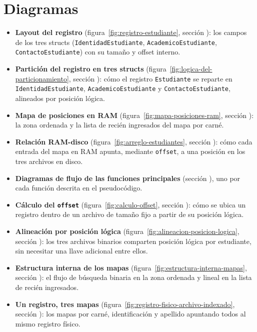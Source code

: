 \section{Diagramas}
\label{sec:diagramas}

\begin{itemize}
    \item \textbf{Layout del registro} (figura~\ref{fig:registro-estudiante}, sección ):
        los campos de los tres structs (\texttt{IdentidadEstudiante}, \texttt{AcademicoEstudiante}, \texttt{ContactoEstudiante}) con su tamaño y offset interno.
    \item \textbf{Partición del registro en tres structs} (figura~\ref{fig:logica-del-particionamiento}, sección ):
        cómo el registro \texttt{Estudiante} se reparte en \texttt{IdentidadEstudiante}, \texttt{AcademicoEstudiante} y \texttt{ContactoEstudiante}, alineados por posición lógica.
    \item \textbf{Mapa de posiciones en RAM} (figura~\ref{fig:mapa-posiciones-ram}, sección ):
        la zona ordenada y la lista de recién ingresados del mapa por carné.
    \item \textbf{Relación RAM-disco} (figura~\ref{fig:arreglo-estudiantes}, sección ):
        cómo cada entrada del mapa en RAM apunta, mediante \texttt{offset}, a una posición en los tres archivos en disco.
    \item \textbf{Diagramas de flujo de las funciones principales} (sección ), uno por cada función descrita en el pseudocódigo.
    \item \textbf{Cálculo del \texttt{offset}} (figura~\ref{fig:calculo-offset}, sección ):
        cómo se ubica un registro dentro de un archivo de tamaño fijo a partir de su posición lógica.
    \item \textbf{Alineación por posición lógica} (figura~\ref{fig:alineacion-posicion-logica}, sección ):
        los tres archivos binarios comparten posición lógica por estudiante, sin necesitar una llave adicional entre ellos.
    \item \textbf{Estructura interna de los mapas} (figura~\ref{fig:estructura-interna-mapas}, sección ):
        el flujo de búsqueda binaria en la zona ordenada y lineal en la lista de recién ingresados.
    \item \textbf{Un registro, tres mapas} (figura~\ref{fig:registro-fisico-archivo-indexado}, sección ):
        los mapas por carné, identificación y apellido apuntando todos al mismo registro físico.
\end{itemize}

